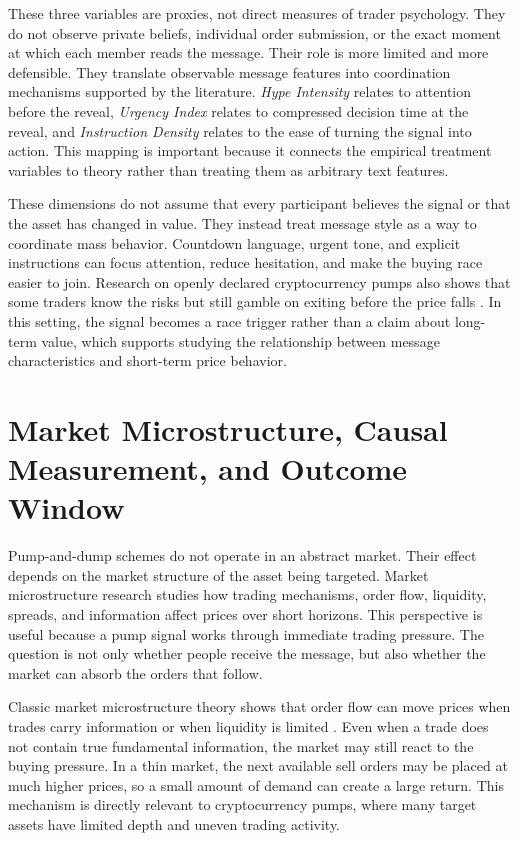 These three variables are proxies, not direct measures of trader psychology. They do not observe private beliefs, individual order submission, or the exact moment at which each member reads the message. Their role is more limited and more defensible. They translate observable message features into coordination mechanisms supported by the literature. \textit{Hype Intensity} relates to attention before the reveal, \textit{Urgency Index} relates to compressed decision time at the reveal, and \textit{Instruction Density} relates to the ease of turning the signal into action. This mapping is important because it connects the empirical treatment variables to theory rather than treating them as arbitrary text features.

These dimensions do not assume that every participant believes the signal or that the asset has changed in value. They instead treat message style as a way to coordinate mass behavior. Countdown language, urgent tone, and explicit instructions can focus attention, reduce hesitation, and make the buying race easier to join. Research on openly declared cryptocurrency pumps also shows that some traders know the risks but still gamble on exiting before the price falls \cite{dhawan2023new}. In this setting, the signal becomes a race trigger rather than a claim about long-term value, which supports studying the relationship between message characteristics and short-term price behavior.

\section{Market Microstructure, Causal Measurement, and Outcome Window}
\label{sec:market-microstructure-short-horizon}
\label{sec:detection-to-causal-measurement}

Pump-and-dump schemes do not operate in an abstract market. Their effect depends on the market structure of the asset being targeted. Market microstructure research studies how trading mechanisms, order flow, liquidity, spreads, and information affect prices over short horizons. This perspective is useful because a pump signal works through immediate trading pressure. The question is not only whether people receive the message, but also whether the market can absorb the orders that follow.

Classic market microstructure theory shows that order flow can move prices when trades carry information or when liquidity is limited \cite{kyle1985continuous}. Even when a trade does not contain true fundamental information, the market may still react to the buying pressure. In a thin market, the next available sell orders may be placed at much higher prices, so a small amount of demand can create a large return. This mechanism is directly relevant to cryptocurrency pumps, where many target assets have limited depth and uneven trading activity.

